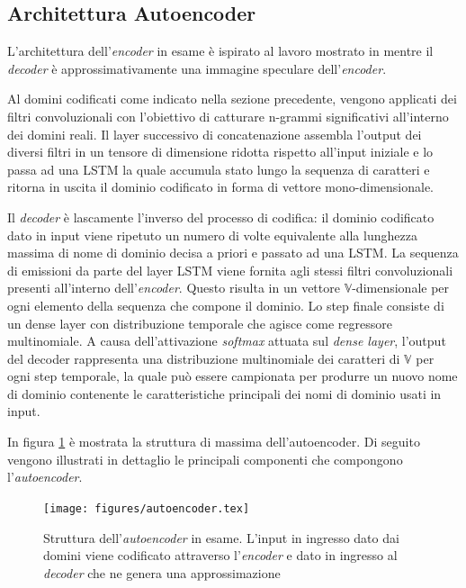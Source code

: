 \subsection{Architettura Autoencoder}
\label{archautoencoder}
L'architettura dell'\textit{encoder} in esame è ispirato al lavoro mostrato in \cite{1508.06615} mentre il \textit{decoder} è approssimativamente una immagine speculare dell'\textit{encoder}.

Al domini codificati come indicato nella sezione precedente, vengono applicati dei filtri convoluzionali con l'obiettivo di catturare n-grammi significativi all'interno dei domini reali. Il layer successivo di concatenazione assembla l'output dei diversi filtri in un tensore di dimensione ridotta rispetto all'input iniziale e lo passa ad una LSTM la quale accumula stato lungo la sequenza di caratteri e ritorna in uscita il dominio codificato in forma di vettore mono-dimensionale.

Il \textit{decoder} è lascamente l'inverso del processo di codifica: il dominio codificato dato in input viene ripetuto un numero di volte equivalente alla lunghezza massima di nome di dominio decisa a priori e passato ad una LSTM. La sequenza di emissioni da parte del layer LSTM viene fornita agli stessi filtri convoluzionali presenti all'interno dell'\textit{encoder}. Questo risulta in un vettore $\mathbb{V}$-dimensionale per ogni elemento della sequenza che compone il dominio.
Lo step finale consiste di un dense layer con distribuzione temporale che agisce come regressore multinomiale. A causa dell'attivazione \textit{softmax} attuata sul \textit{dense layer}, l'output del decoder rappresenta una distribuzione multinomiale dei caratteri di $\mathbb{V}$ per ogni step temporale, la quale può essere campionata per produrre un nuovo nome di dominio contenente le caratteristiche principali dei nomi di dominio usati in input.

In figura \ref{fig:autoencoder1} è mostrata la struttura di massima dell'autoencoder. Di seguito vengono illustrati in dettaglio le principali componenti che compongono l'\textit{autoencoder}. 

\begin{figure}[!p]
    \centering
	\texttt{[image: figures/autoencoder.tex]}
	\caption{Struttura dell'\textit{autoencoder} in esame. L'input in ingresso dato dai domini viene codificato attraverso l'\textit{encoder} e dato in ingresso al \textit{decoder} che ne genera una approssimazione}
\label{fig:autoencoder1}
\end{figure}

